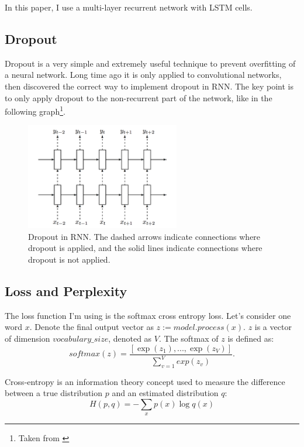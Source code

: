 \documentclass[a4paper]{article}
\begin{document}
In this paper, I use a multi-layer recurrent network with LSTM cells.

\subsection{Dropout}
Dropout is a very simple and extremely useful technique to prevent overfitting of a neural network. Long time ago it is only applied to convolutional networks, then \cite{zaremba2014recurrent} discovered the correct way to implement dropout in RNN. The key point is to only apply dropout to the non-recurrent part of the network, like in the following graph\footnote{Taken from \cite{zaremba2014recurrent}}. 

\begin{figure}[H]
\centering
\includegraphics[width=0.6\textwidth]{rnn_dropout.png}
\caption{Dropout in RNN.  The dashed arrows indicate connections where dropout is applied, and the solid lines indicate connections where dropout is not applied.}
\end{figure}

\subsection{Loss and Perplexity}
The loss function I'm using is the softmax cross entropy loss. Let's consider one word $x$. Denote the final output vector as $z := model.process(x)$. $z$ is a vector of dimension $vocabulary\_size$, denoted as $V$. The softmax of $z$ is defined as:
\begin{equation}
  softmax(z) = \frac{[\exp(z_1), ... , \exp(z_V)]}{\sum_{v=1}^V exp(z_v)}.
\end{equation} 

Cross-entropy \citep{karpathy231n} is an information theory concept used to measure the difference between a true distribution $p$ and an estimated distribution $q$:
\begin{equation}
 H(p, q) = - \sum_x p(x) \log q(x)
\end{equation}
\end{document}
